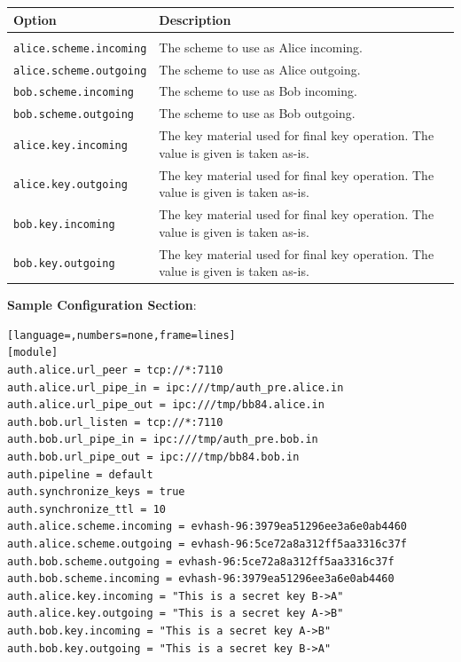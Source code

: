 \medskip

\begin{tabular}{lp{9cm}}

Option                              & Description \\
\hline
\\
\texttt{alice.scheme.incoming}      & The scheme to use as Alice incoming. \\ [0.5em]
\texttt{alice.scheme.outgoing}      & The scheme to use as Alice outgoing. \\ [0.5em]
\texttt{bob.scheme.incoming}        & The scheme to use as Bob incoming. \\ [0.5em]
\texttt{bob.scheme.outgoing}        & The scheme to use as Bob outgoing. \\ [0.5em]
\texttt{alice.key.incoming}         & The key material used for final key operation. The value is given is taken as-is. \\ [0.5em]
\texttt{alice.key.outgoing}         & The key material used for final key operation. The value is given is taken as-is. \\ [0.5em]
\texttt{bob.key.incoming}           & The key material used for final key operation. The value is given is taken as-is. \\ [0.5em]
\texttt{bob.key.outgoing}           & The key material used for final key operation. The value is given is taken as-is. \\ [0.5em]

\end{tabular}

\bigskip

\noindent \textbf{Sample Configuration Section}: 

\medskip

\begin{lstlisting}[language=,numbers=none,frame=lines]
[module]
auth.alice.url_peer = tcp://*:7110
auth.alice.url_pipe_in = ipc:///tmp/auth_pre.alice.in
auth.alice.url_pipe_out = ipc:///tmp/bb84.alice.in
auth.bob.url_listen = tcp://*:7110
auth.bob.url_pipe_in = ipc:///tmp/auth_pre.bob.in
auth.bob.url_pipe_out = ipc:///tmp/bb84.bob.in
auth.pipeline = default
auth.synchronize_keys = true
auth.synchronize_ttl = 10
auth.alice.scheme.incoming = evhash-96:3979ea51296ee3a6e0ab4460
auth.alice.scheme.outgoing = evhash-96:5ce72a8a312ff5aa3316c37f
auth.bob.scheme.outgoing = evhash-96:5ce72a8a312ff5aa3316c37f
auth.bob.scheme.incoming = evhash-96:3979ea51296ee3a6e0ab4460
auth.alice.key.incoming = "This is a secret key B->A"
auth.alice.key.outgoing = "This is a secret key A->B"
auth.bob.key.incoming = "This is a secret key A->B"
auth.bob.key.outgoing = "This is a secret key B->A"
\end{lstlisting}

